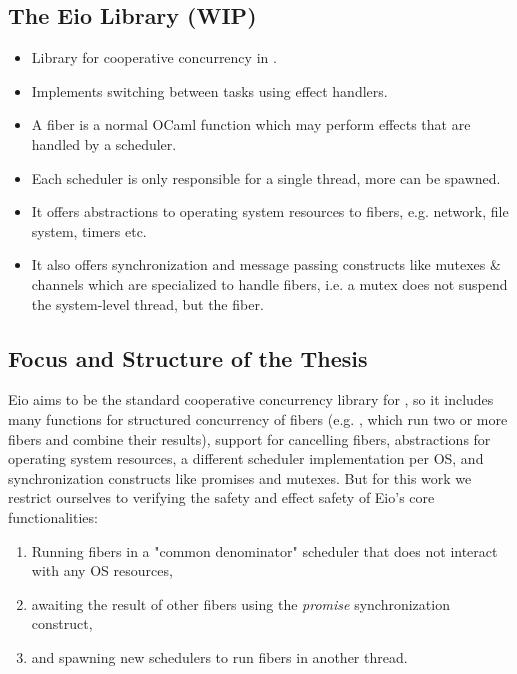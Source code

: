 \subsection{The Eio Library (WIP)}
\label{sec:intro-eio}

\begin{itemize}
  \item Library for cooperative concurrency in \ocf{}.
  \item Implements switching between tasks using effect handlers.
  \item A fiber is a normal OCaml function which may perform effects that are handled by a scheduler.
  \item Each scheduler is only responsible for a single thread, more can be spawned.
  \item It offers abstractions to operating system resources to fibers, e.g. network, file system, timers etc.
  \item It also offers synchronization and message passing constructs like mutexes \& channels which are specialized to handle fibers, i.e. a mutex does not suspend the system-level thread, but the fiber.
\end{itemize}

\subsection{Focus and Structure of the Thesis}
\label{sec:intro-structure}

Eio aims to be the standard cooperative concurrency library for \ocf{}, so it includes many functions for structured concurrency of fibers (e.g. , which run two or more fibers and combine their results), support for cancelling fibers, abstractions for operating system resources, a different scheduler implementation per OS, and synchronization constructs like promises and mutexes.
But for this work we restrict ourselves to verifying the safety and effect safety of Eio's core functionalities:
\begin{enumerate}
  \item Running fibers in a "common denominator" scheduler that does not interact with any OS resources,
  \item awaiting the result of other fibers using the \emph{promise} synchronization construct,
  \item and spawning new schedulers to run fibers in another thread.
\end{enumerate}

